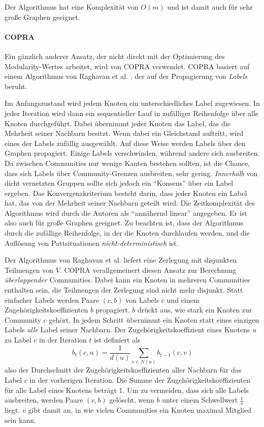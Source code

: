 Der Algorithmus hat eine Komplexität von $O(m)$ und ist damit auch
für sehr große Graphen geeignet.

\paragraph{COPRA}
\label{sec:copra}

Ein gänzlich anderer Ansatz, der nicht direkt mit der Optimierung
des Modularity-Wertes arbeitet, wird von COPRA \cite{Gregory2010}
verwendet. COPRA basiert auf einem Algorithmus von Raghavan et
al. \cite{Raghavan2007}, der auf der Propagierung von \emph{Labels}
beruht. 

Im Anfangszustand wird jedem Knoten ein unterschiedliches Label
zugewiesen. In jeder Iteration wird dann ein sequentieller Lauf in
zufälliger Reihenfolge über alle Knoten durchgeführt. Dabei
übernimmt jeder Knoten das Label, das die Mehrheit seiner Nachbarn
besitzt. Wenn dabei ein Gleichstand auftritt, wird eines der Labels
zufällig ausgewählt. Auf diese Weise werden Labels über den
Graphen propagiert. Einige Labels verschwinden, während andere sich
ausbreiten. Da zwischen Communities nur wenige Kanten bestehen
sollten, ist die Chance, dass sich Labels über Community-Grenzen
ausbreiten, sehr gering. \emph{Innerhalb} von dicht vernetzten Gruppen
sollte sich jedoch ein ``Konsens'' über ein Label ergeben. Das
Konvergenzkriterium besteht darin, dass jeder Knoten ein Label hat,
das von der Mehrheit seiner Nachbarn geteilt wird. Die
Zeitkomplexität des Algorithmus wird durch die Autoren als
``annähernd linear'' angegeben. Er ist also auch für große
Graphen geeignet. Zu beachten ist, dass der Algorithmus durch die
zufällige Reihenfolge, in der die Knoten durchlaufen werden, und die
Auflösung von Pattsituationen \emph{nicht-deterministisch} ist.

Der Algorithmus von Raghavan et al. liefert eine Zerlegung mit
disjunkten Teilmengen von $V$. COPRA verallgemeinert diesen Ansatz zur
Berechnung \emph{überlappender} Communities. Dabei kann ein Knoten
in mehreren Communities enthalten sein, die Teilmengen der Zerlegung
sind nicht mehr disjunkt. Statt einfacher Labels werden Paare $(c, b)$
von Labels $c$ und einem Zugehörigkeitskoeffizienten $b$
propagiert. $b$ drückt aus, wie stark ein Knoten zur Community $c$
gehört. In jedem Schritt übernimmt ein Knoten statt eines einzigen
Labels \emph{alle} Label seiner Nachbarn. Der
Zugehörigkeitskoeffizient eines Knotens $u$ zu Label $c$ in der
Iteration $t$ ist definiert als
\begin{equation}
  \label{eq:10}
  b_t(c, u) = \frac{1}{d(u)}\sum_{v \in N(u)}b_{t-1}(c, v)
\end{equation}
also der Durchschnitt der Zugehörigkeitskoeffizienten aller
Nachbarn für das Label $c$ in der vorherigen Iteration. Die Summe
der Zugehörigkeitskoeffizienten für alle Label eines Knotens
beträgt 1. Um zu vermeiden, dass sich alle Labels ausbreiten, werden
Paare $(c, b)$ gelöscht, wenn $b$ unter einem Schwellwert
$\frac{1}{v}$ liegt. $v$ gibt damit an, in wie vielen Communities ein
Knoten maximal Mitglied sein kann. 


